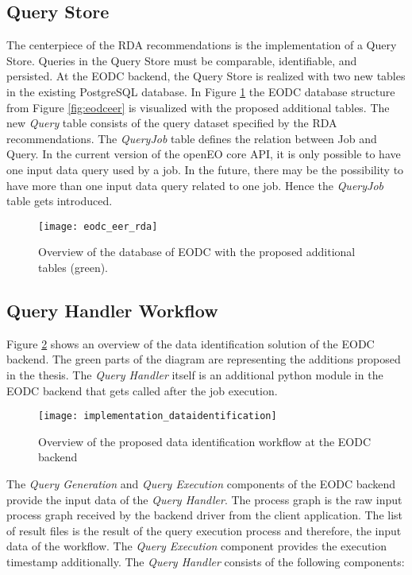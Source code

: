 \documentclass[draft,final]{vutinfth} %
\begin{document}
\subsection{Query Store}
The centerpiece of the RDA recommendations is the implementation of a Query Store. Queries in the Query Store must be comparable, identifiable, and persisted. At the EODC backend, the Query Store is realized with two new tables in the existing PostgreSQL database. In Figure \ref{fig:eer_rda} the EODC database structure from Figure \ref{fig:eodceer} is visualized with the proposed additional tables. The new \textit{Query} table consists of the query dataset specified by the RDA recommendations. The \textit{QueryJob} table defines the relation between Job and Query. In the current version of the openEO core API, it is only possible to have one input data query used by a job. In the future, there may be the possibility to have more than one input data query related to one job. Hence the \textit{QueryJob} table gets introduced. 

\begin{figure}[h]
	\centering
	\texttt{[image: eodc\_eer\_rda]}
	\caption{Overview of the database of EODC with the proposed additional tables (green).}
	\label{fig:eer_rda} %
\end{figure}

\subsection{Query Handler Workflow}
Figure \ref{fig:impldataid} shows an overview of the data identification solution of the EODC backend. The green parts of the diagram are representing the additions proposed in the thesis. The \textit{Query Handler} itself is an additional python module in the EODC backend that gets called after the job execution. 

\begin{figure}[h]
	\centering
	\texttt{[image: implementation\_dataidentification]}
	\caption{Overview of the proposed data identification workflow at the EODC backend}
	\label{fig:impldataid} %
\end{figure}

The \textit{Query Generation} and \textit{Query Execution} components of the EODC backend provide the input data of the \textit{Query Handler}. The process graph is the raw input process graph received by the backend driver from the client application. The list of result files is the result of the query execution process and therefore, the input data of the workflow. The \textit{Query Execution} component provides the execution timestamp additionally. The \textit{Query Handler} consists of the following components:
\end{document}

